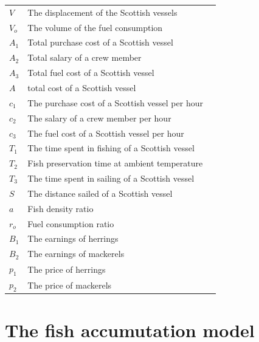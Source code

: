 \documentclass{mcmthesis}
\begin{document}
\begin{center}
\begin{longtable}{p{}p{}m{}}
$V$      & The displacement of the Scottish vessels 
                                                          \\
$V_o$      & The volume of the fuel consumption
                                                          \\
$A_1$     & Total purchase cost of a Scottish vessel
                                                        \\
$A_2$       & Total salary of a crew member                                                           \\
$A_3$      & Total fuel cost of a Scottish vessel                                        \\
$A$      & total cost of a Scottish vessel                                        \\
$c_1$     & The purchase cost of a Scottish vessel per hour
                                                        \\
$c_2$       & The salary of a crew member per hour                                                     \\
$c_3$      & The fuel cost of a Scottish vessel per hour                                       \\

$T_1$     & The time spent in fishing of a Scottish vessel   
                                                        \\
$T_2$       & Fish preservation time at ambient temperature        \\
$T_3$      & The time spent in sailing of a Scottish vessel     \\
$S$      & The distance sailed of a Scottish vessel   \\
$a$      & Fish density ratio \\
$r_o$      & Fuel consumption ratio \\
$B_1$      & The earnings  of herrings \\
$B_2$      & The earnings  of mackerels  \\
$p_1$      & The price  of herrings \\
$p_2$      & The price  of mackerels  \\






 \end{longtable}
 \end{center}

 \section{The fish accumutation model}
\end{document}
